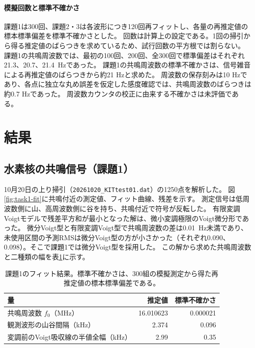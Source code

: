 \documentclass[dvipdfmx,a4paper,11pt]{jsarticle}
\begin{document}
\paragraph{模擬回数と標準不確かさ}
課題1は300回、課題2・3は各波形につき120回再フィットし、各量の再推定値の標本標準偏差を標準不確かさとした。
回数は計算上の設定である。1回の掃引から得る推定値のばらつきを求めているため、試行回数の平方根では割らない。
課題1の共鳴周波数では、最初の100回、200回、全300回で標準偏差はそれぞれ21.3、20.7、\SI{21.4}{\hertz}であった。
課題1の共鳴周波数の標準不確かさは、信号雑音による再推定値のばらつきから約21 Hzと求めた。
周波数の保存刻みは10 Hzであり、各点に独立な丸め誤差を仮定した感度確認では、共鳴周波数のばらつきは約0.7 Hzであった。
周波数カウンタの校正に由来する不確かさは未評価である。

\section{結果}
\label{sec:results}

\subsection{水素核の共鳴信号（課題1）}
10月20日の上り掃引（\texttt{20261020\_KITtest01.dat}）の1250点を解析した。
図\ref{fig:task1-fit}に共鳴付近の測定値、フィット曲線、残差を示す。
測定信号は低周波数側に山、高周波数側に谷を持ち、共鳴付近で符号が反転した。
有限変調Voigtモデルで残差平方和が最小となった解は、微小変調極限のVoigt微分形であった。
微分Voigt型と有限変調Voigt型で共鳴周波数の差は\SI{0.01}{\hertz}未満であり、未使用区間の予測RMSは微分Voigt型の方が小さかった（それぞれ0.090、0.098）。そこで課題1では微分Voigt型を採用した。
この解から求めた共鳴周波数と二種類の幅を表\ref{tab:task1-results}に示す。

\begin{table}[htbp]
  \centering
  \caption{課題1のフィット結果。標準不確かさは、300組の模擬測定から得た再推定値の標本標準偏差である。}
  \label{tab:task1-results}
  \begin{tabular}{lrr}
    \toprule
    量 & 推定値 & 標準不確かさ\\
    \midrule
    共鳴周波数 $f_0$（MHz） & 16.010623 & 0.000021\\
    観測波形の山谷間隔（kHz） & 2.374 & 0.096\\
    変調前のVoigt吸収線の半値全幅（kHz） & 2.99 & 0.35\\
    \bottomrule
  \end{tabular}
\end{table}
\end{document}
